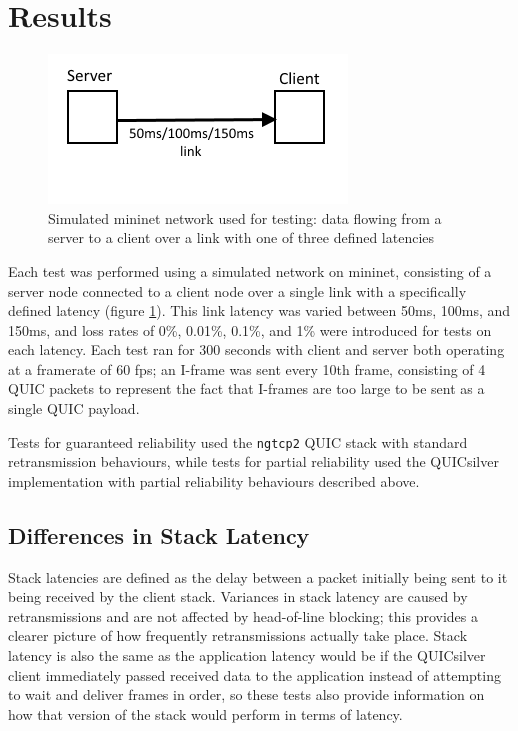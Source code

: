 \documentclass{mpaper}
\begin{document}



\section{Results}

\begin{figure}[h!]
\includegraphics[scale=0.7]{images/topology}
\centering
\caption{Simulated mininet network used for testing: data flowing from a server to a client over a link with one of three defined latencies}
\label{topology}
\end{figure}

Each test was performed using a simulated network on mininet, consisting of a server node connected to a client node over a single link with a specifically defined latency (figure \ref{topology}). This link latency was varied between 50ms, 100ms, and 150ms, and loss rates of 0\%, 0.01\%, 0.1\%, and 1\% were introduced for tests on each latency. Each test ran for 300 seconds with client and server both operating at a framerate of 60 fps; an I-frame was sent every 10th frame, consisting of 4 QUIC packets to represent the fact that I-frames are too large to be sent as a single QUIC payload.


Tests for guaranteed reliability used the \texttt{ngtcp2} QUIC stack with standard retransmission behaviours, while tests for partial reliability used the QUICsilver implementation with partial reliability behaviours described above.

\subsection{Differences in Stack Latency}

Stack latencies are defined as the delay between a packet initially being sent to it being received by the client stack. Variances in stack latency are caused by retransmissions and are not affected by head-of-line blocking; this provides a clearer picture of how frequently retransmissions actually take place. Stack latency is also the same as the application latency would be if the QUICsilver client immediately passed received data to the application instead of attempting to wait and deliver frames in order, so these tests also provide information on how that version of the stack would perform in terms of latency.
\end{document}
